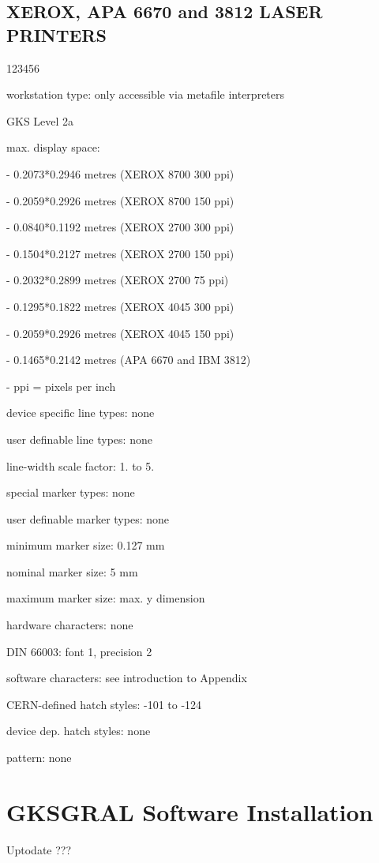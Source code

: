 \section{XEROX, APA 6670 and 3812 LASER PRINTERS}
\begin{DLtt}{123456}
\item[workstation type:]only accessible via metafile interpreters
\item[GKS Level]2a
\item[max. display space:]
\item[-]0.2073*0.2946 metres (XEROX 8700 300 ppi)
\item[-]0.2059*0.2926 metres (XEROX 8700 150 ppi)
\item[-]0.0840*0.1192 metres (XEROX 2700 300 ppi)
\item[-]0.1504*0.2127 metres (XEROX 2700 150 ppi)
\item[-]0.2032*0.2899 metres (XEROX 2700  75 ppi)
\item[-]0.1295*0.1822 metres (XEROX 4045 300 ppi)
\item[-]0.2059*0.2926 metres (XEROX 4045 150 ppi)
\item[-]0.1465*0.2142 metres (APA 6670 and IBM 3812)
\item[-]ppi = pixels per inch
\item[device specific line types:]none
\item[user definable line types:]none
\item[line-width scale factor:]1. to 5.
\item[special marker types:]none
\item[user definable marker types:]none
\item[minimum marker size:]0.127 mm
\item[nominal marker size:]5 mm
\item[maximum marker size:]max. y dimension
\item[hardware characters:]none
\item[DIN 66003:]font 1, precision 2
\item[software characters:]see introduction to Appendix
\item[CERN-defined hatch styles:]-101 to -124
\item[device dep. hatch styles:]none
\item[pattern:]none
\end{DLtt}
\chapter{\protect\label{sec:instref}GKSGRAL Software Installation}
\Lit{$==>$} Uptodate ???
 
